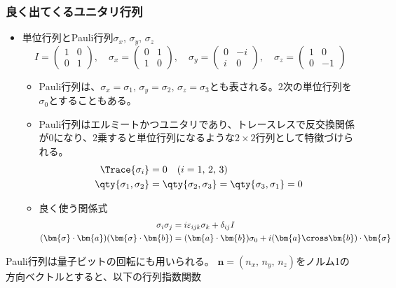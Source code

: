 \documentclass[a4paper,11pt,uplatex]{jsarticle}%
\begin{document}
\subsubsection{良く出てくるユニタリ行列}
\begin{itemize}
  \item 単位行列とPauli行列$\sigma_x,\,\sigma_y,\,\sigma_z$
  \begin{equation}
    I=
    \begin{pmatrix}
    1 & 0 \\ 0 & 1  
    \end{pmatrix}
    ,\quad\sigma_x = 
    \begin{pmatrix}
      0 & 1 \\ 1 & 0
    \end{pmatrix}
    ,\quad\sigma_y = 
    \begin{pmatrix}
      0 & -i \\ i & 0
    \end{pmatrix}
    ,\quad\sigma_z = 
    \begin{pmatrix}
      1 & 0 \\ 0 & -1
    \end{pmatrix}
  \end{equation}
  \begin{itemize}
    \item Pauli行列は、$\sigma_x=\sigma_1,\,\sigma_y=\sigma_2,\,\sigma_z=\sigma_3$とも表される。2次の単位行列を$\sigma_0$とすることもある。
    \item Pauli行列はエルミートかつユニタリであり、トレースレスで反交換関係が$0$になり、2乗すると単位行列になるような$2\times 2$行列として特徴づけられる。
    \begin{align}
      \Trace{\sigma_i}&=0\quad(i=1,\,2,\,3) \\ 
      \qty{\sigma_1,\sigma_2}&=\qty{\sigma_2,\sigma_3}=\qty{\sigma_3,\sigma_1}=0
    \end{align}
    \item 良く使う関係式
    \begin{align}
      \sigma_i\sigma_j &= i\varepsilon_{ijk}\sigma_k + \delta_{ij}I\\
      (\bm{\sigma}\cdot\bm{a})(\bm{\sigma}\cdot\bm{b})&=(\bm{a}\cdot\bm{b})\sigma_0+i(\bm{a}\cross\bm{b})\cdot\bm{\sigma}
    \end{align}
  \end{itemize}
\end{itemize}
Pauli行列は量子ビットの回転にも用いられる。
$\bm{n}=(n_x,\,n_y,\,n_z)$をノルム1の方向ベクトルとすると、以下の行列指数関数
\end{document}
